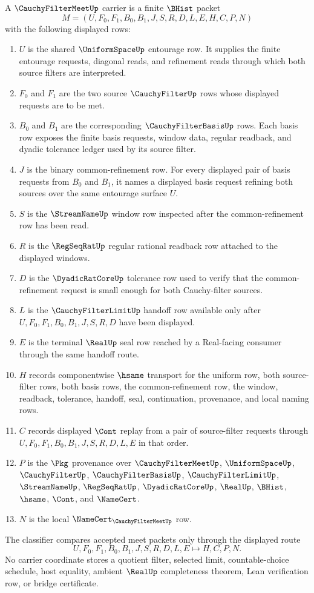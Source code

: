\begin{definition}
\label{def:cauchy-filter-meet-carrier}
A $\CauchyFilterMeetUp$ carrier is a finite $\BHist$ packet
$$
M=(U,F_0,F_1,B_0,B_1,J,S,R,D,L,E,H,C,P,N)
$$
with the following displayed rows:
\begin{enumerate}
\item $U$ is the shared $\UniformSpaceUp$ entourage row. It supplies the finite entourage requests, diagonal reads, and refinement reads through which both source filters are interpreted.
\item $F_0$ and $F_1$ are the two source $\CauchyFilterUp$ rows whose displayed requests are to be met.
\item $B_0$ and $B_1$ are the corresponding $\CauchyFilterBasisUp$ rows. Each basis row exposes the finite basis requests, window data, regular readback, and dyadic tolerance ledger used by its source filter.
\item $J$ is the binary common-refinement row. For every displayed pair of basis requests from $B_0$ and $B_1$, it names a displayed basis request refining both sources over the same entourage surface $U$.
\item $S$ is the $\StreamNameUp$ window row inspected after the common-refinement row has been read.
\item $R$ is the $\RegSeqRatUp$ regular rational readback row attached to the displayed windows.
\item $D$ is the $\DyadicRatCoreUp$ tolerance row used to verify that the common-refinement request is small enough for both Cauchy-filter sources.
\item $L$ is the $\CauchyFilterLimitUp$ handoff row available only after $U,F_0,F_1,B_0,B_1,J,S,R,D$ have been displayed.
\item $E$ is the terminal $\RealUp$ seal row reached by a Real-facing consumer through the same handoff route.
\item $H$ records componentwise $\hsame$ transport for the uniform row, both source-filter rows, both basis rows, the common-refinement row, the window, readback, tolerance, handoff, seal, continuation, provenance, and local naming rows.
\item $C$ records displayed $\Cont$ replay from a pair of source-filter requests through $U,F_0,F_1,B_0,B_1,J,S,R,D,L,E$ in that order.
\item $P$ is the $\Pkg$ provenance over $\CauchyFilterMeetUp$, $\UniformSpaceUp$, $\CauchyFilterUp$, $\CauchyFilterBasisUp$, $\CauchyFilterLimitUp$, $\StreamNameUp$, $\RegSeqRatUp$, $\DyadicRatCoreUp$, $\RealUp$, $\BHist$, $\hsame$, $\Cont$, and $\NameCert$.
\item $N$ is the local $\NameCert_{\CauchyFilterMeetUp}$ row.
\end{enumerate}
The classifier compares accepted meet packets only through the displayed route
$$
U,F_0,F_1,B_0,B_1,J,S,R,D,L,E \longmapsto H,C,P,N .
$$
No carrier coordinate stores a quotient filter, selected limit, countable-choice schedule, host equality, ambient $\RealUp$ completeness theorem, Lean verification row, or bridge certificate.
\end{definition}
